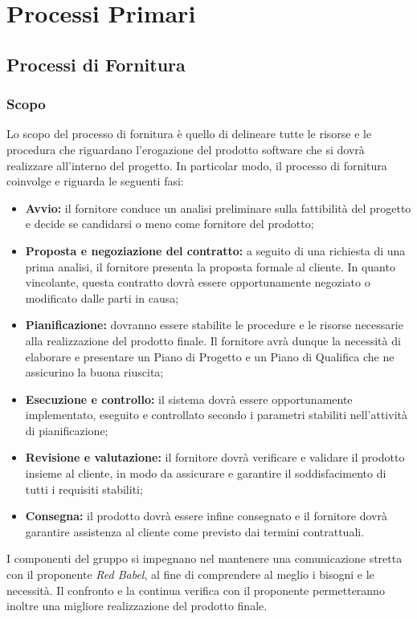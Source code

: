 \section{Processi Primari}
\subsection{Processi di Fornitura}
\subsubsection{Scopo}
Lo scopo del processo di fornitura è quello di delineare tutte le risorse e le procedura che riguardano l'erogazione del prodotto software che si dovrà realizzare all'interno del progetto. In particolar modo, il processo di fornitura coinvolge e riguarda le seguenti fasi:
\begin{itemize}
	\item \textbf{Avvio:} il fornitore conduce un analisi preliminare sulla fattibilità del progetto e decide se candidarsi o meno come fornitore del prodotto;
	\item \textbf{Proposta e negoziazione del contratto:} a seguito di una richiesta di una prima analisi, il fornitore presenta la proposta formale al cliente. In quanto vincolante, questa contratto dovrà essere opportunamente negoziato o modificato dalle parti in causa;
	\item \textbf{Pianificazione:} dovranno essere stabilite le procedure e le risorse necessarie alla realizzazione del prodotto finale. Il fornitore avrà dunque la necessità di elaborare e presentare un Piano di Progetto e un Piano di Qualifica che ne assicurino la buona riuscita;
	\item \textbf{Esecuzione e controllo:} il sistema dovrà essere opportunamente implementato, eseguito e controllato secondo i parametri stabiliti nell'attività di pianificazione;
	\item \textbf{Revisione e valutazione:} il fornitore dovrà verificare e validare il prodotto insieme al cliente, in modo da assicurare e garantire il soddisfacimento di tutti i requisiti stabiliti;
	\item \textbf{Consegna:} il prodotto dovrà essere infine consegnato e il fornitore dovrà garantire assistenza al cliente come previsto dai termini contrattuali.
\end{itemize} 
I componenti del gruppo si impegnano nel mantenere una comunicazione stretta con il proponente \textit{Red Babel}, al fine di comprendere al meglio i bisogni e le necessità. Il confronto e la continua verifica con il proponente permetteranno inoltre una migliore realizzazione del prodotto finale.

